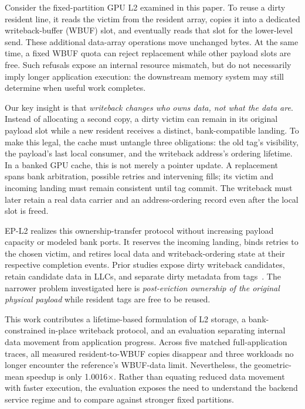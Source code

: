 \documentclass[conference,letterpaper]{IEEEtran}
\begin{document}
Consider the fixed-partition GPU L2 examined in this paper. To reuse a dirty resident line, it reads the victim from the resident array, copies it into a dedicated writeback-buffer (WBUF) slot, and eventually reads that slot for the lower-level send. These additional data-array operations move unchanged bytes. At the same time, a fixed WBUF quota can reject replacement while other payload slots are free. Such refusals expose an internal resource mismatch, but do not necessarily imply longer application execution: the downstream memory system may still determine when useful work completes.

Our key insight is that \emph{writeback changes who owns data, not what the data are}. Instead of allocating a second copy, a dirty victim can remain in its original payload slot while a new resident receives a distinct, bank-compatible landing. To make this legal, the cache must untangle three obligations: the old tag's visibility, the payload's last local consumer, and the writeback address's ordering lifetime. In a banked GPU cache, this is not merely a pointer update. A replacement spans bank arbitration, possible retries and intervening fills; its victim and incoming landing must remain consistent until tag commit. The writeback must later retain a real data carrier and an address-ordering record even after the local slot is freed.

EP-L2 realizes this ownership-transfer protocol without increasing payload capacity or modeled bank ports. It reserves the incoming landing, binds retries to the chosen victim, and retires local data and writeback-ordering state at their respective completion events. Prior studies expose dirty writeback candidates, retain candidate data in LLCs, and separate dirty metadata from tags~\cite{vwq,lastwrite,dbi}. The narrower problem investigated here is \emph{post-eviction ownership of the original physical payload} while resident tags are free to be reused.

This work contributes a lifetime-based formulation of L2 storage, a bank-constrained in-place writeback protocol, and an evaluation separating internal data movement from application progress. Across five matched full-application traces, all measured resident-to-WBUF copies disappear and three workloads no longer encounter the reference's WBUF-data limit. Nevertheless, the geometric-mean speedup is only 1.0016$\times$. Rather than equating reduced data movement with faster execution, the evaluation exposes the need to understand the backend service regime and to compare against stronger fixed partitions.
\end{document}
